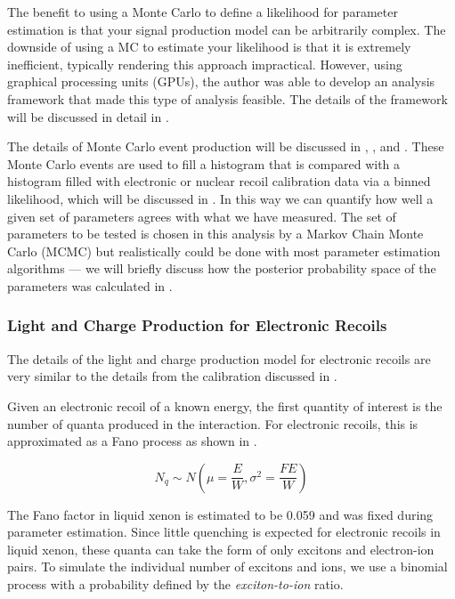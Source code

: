 The benefit to using a Monte Carlo to define a likelihood for parameter estimation is that your signal production model can be arbitrarily complex.  The downside of using a MC to estimate your likelihood is that it is extremely inefficient, typically rendering this approach impractical.  However, using graphical processing units (GPUs), the author was able to develop an analysis framework that made this type of analysis feasible.  The details of the framework will be discussed in detail in .

The details of Monte Carlo event production will be discussed in , , and .  These Monte Carlo events are used to fill a histogram that is compared with a histogram filled with electronic or nuclear recoil calibration data via a binned likelihood, which will be discussed in .  In this way we can quantify how well a given set of parameters agrees with what we have measured.  The set of parameters to be tested is chosen in this analysis by a Markov Chain Monte Carlo (MCMC) but realistically could be done with most parameter estimation algorithms --- we will briefly discuss how the posterior probability space of the parameters was calculated in .
 

\subsubsection{Light and Charge Production for Electronic Recoils}
\label{sec:xe1t_mc_observables_production_er}

The details of the light and charge production model for electronic recoils are very similar to the details from the calibration discussed in .  

Given an electronic recoil of a known energy, the first quantity of interest is the number of quanta produced in the interaction.  For electronic recoils, this is approximated as a Fano process as shown in .

\begin{equation}
        \label{eqn:xe1t_er_fano}
        N_q \sim N \left( \mu = \frac{E}{W}, \sigma^2 = \frac{F E}{W} \right) 
\end{equation}

The Fano factor in liquid xenon is estimated to be 0.059 \cite{doke1976estimation} and was fixed during parameter estimation.  Since little quenching is expected for electronic recoils in liquid xenon, these quanta can take the form of only excitons and electron-ion pairs.   To simulate the individual number of excitons and ions, we use a binomial process with a probability defined by the \textit{exciton-to-ion} ratio.


